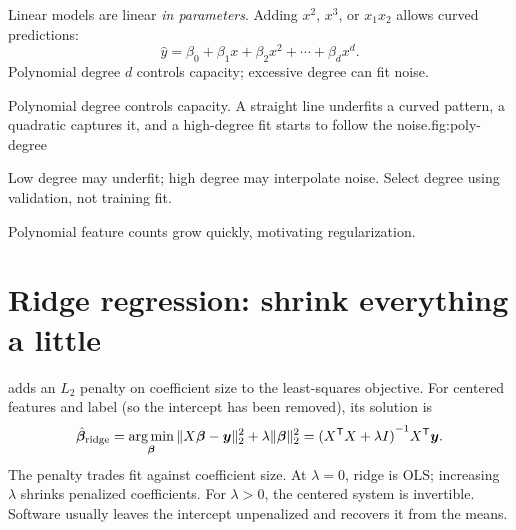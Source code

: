 Linear models are linear \emph{in parameters}. Adding $x^2$, $x^3$, or $x_1x_2$ allows curved predictions:
\[
  \hat{y}=\beta_0+\beta_1x+\beta_2x^2+\cdots+\beta_dx^d.
\]
Polynomial degree $d$ controls capacity; excessive degree can fit noise.

\begin{utpfig}{Polynomial degree controls capacity. A straight line underfits a curved pattern, a quadratic captures it, and a high-degree fit starts to follow the noise.}{fig:poly-degree}
\end{utpfig}

\begin{intuition}
Low degree may underfit; high degree may interpolate noise. Select degree using validation, not training fit.
\end{intuition}

Polynomial feature counts grow quickly, motivating regularization.

\section{Ridge regression: shrink everything a little}

 adds an $L_2$ penalty on coefficient size to the least-squares objective. For centered features and label (so the intercept has been removed), its solution is
\[
  \hat{\bm{\beta}}_{\mathrm{ridge}}
  =\operatorname*{arg\,min}_{\bm{\beta}}
  \|X\bm{\beta}-\bm{y}\|_2^2
  +\lambda\|\bm{\beta}\|_2^2
  ={(X^{\mathsf T}X+\lambda I)}^{-1}X^{\mathsf T}\bm{y}.
\]
The penalty trades fit against coefficient size. At $\lambda=0$, ridge is OLS; increasing $\lambda$ shrinks penalized coefficients. For $\lambda>0$, the centered system is invertible. Software usually leaves the intercept unpenalized and recovers it from the means.

